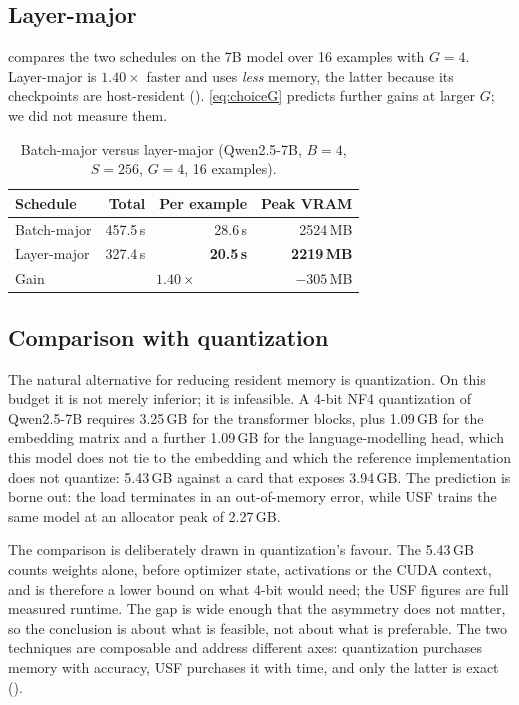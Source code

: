 \documentclass[journal]{IEEEtran}
\newcommand{\usf}{USF}
\begin{document}
\subsection{Layer-major}

 compares the two schedules on the 7B model over 16 examples with $G=4$. Layer-major
is $1.40\times$ faster and uses \emph{less} memory, the latter because its checkpoints are
host-resident (). \eqref{eq:choiceG} predicts further gains at larger $G$; we did
not measure them.

\begin{table}[t]
\centering
\caption{Batch-major versus layer-major (Qwen2.5-7B, $B{=}4$, $S{=}256$, $G{=}4$, 16 examples).}
\label{tab:lm}
\footnotesize
\begin{tabular}{@{}lrrr@{}}
\toprule
\textbf{Schedule} & \textbf{Total} & \textbf{Per example} & \textbf{Peak VRAM} \\
\midrule
Batch-major & 457.5\,s & 28.6\,s & 2524\,MB \\
Layer-major & 327.4\,s & \textbf{20.5\,s} & \textbf{2219\,MB} \\
\midrule
Gain & \multicolumn{2}{c}{$\mathbf{1.40\times}$} & $-305$\,MB \\
\bottomrule
\end{tabular}
\end{table}

\subsection{Comparison with quantization}
\label{sec:quant}

The natural alternative for reducing resident memory is quantization. On this budget it is not
merely inferior; it is infeasible. A 4-bit NF4 quantization of Qwen2.5-7B requires 3.25\,GB for the
transformer blocks, plus 1.09\,GB for the embedding matrix and a further 1.09\,GB for the
language-modelling head, which this model does not tie to the embedding and which the reference
implementation does not quantize: 5.43\,GB against a card that exposes 3.94\,GB. The prediction is
borne out: the load terminates in an out-of-memory error, while \usf{} trains the same model at
an allocator peak of 2.27\,GB.

The comparison is deliberately drawn in quantization's favour. The 5.43\,GB counts weights alone,
before optimizer state, activations or the CUDA context, and is therefore a lower bound on what
4-bit would need; the \usf{} figures are full measured runtime. The gap is wide enough that the
asymmetry does not matter, so the conclusion is about what is feasible, not about what is
preferable. The two techniques are composable and address different axes:
quantization purchases memory with accuracy, \usf{} purchases it with time, and only the latter is
exact ().
\end{document}
